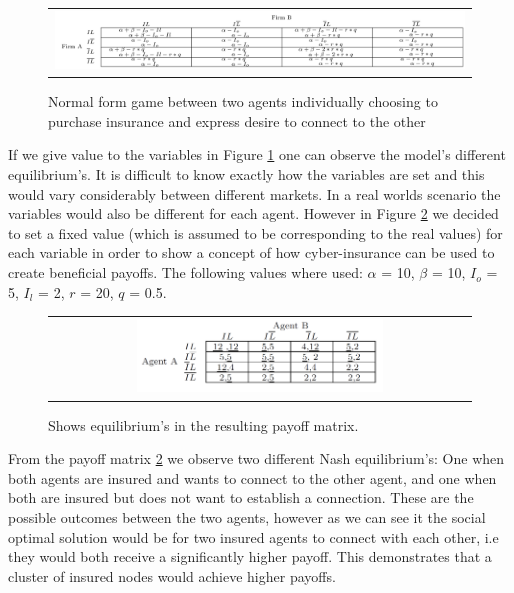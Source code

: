  
\begin{figure}[h]
\centering
\begin{tabular}{@{}c@{}}
\includegraphics[width=1.0\textwidth]{../Figures/gameTheoryModel1WithEquations.png}
\end{tabular}
\caption[Caption for LOF]{\label{fig:GTmodel1equations} Normal form game between two agents individually choosing to purchase insurance and express desire to connect to the other  \footnotemark }
\end{figure}

If we give value to the variables in Figure \ref{fig:GTmodel1equations} one can observe the model's different equilibrium's. It is difficult to know exactly how the variables are set and this would vary considerably between different markets. In a real worlds scenario the variables would also be different for each agent. However in Figure \ref{fig:GTmodel1} we decided to set a fixed value (which is assumed to be corresponding to the real values) for each variable in order to show a concept of how cyber-insurance can be used to create beneficial payoffs.
The following values where used: $\alpha$ = 10, $\beta$ = 10, $I_{o}$ = 5, $I_{l}$ = 2, $r$  = 20, $q$ = 0.5.


\begin{figure}[h]
\centering
\begin{tabular}{@{}c@{}}
\includegraphics[width=0.6\textwidth]{../Figures/gameTheoryModel1WithNumbers.png}
\end{tabular}
\caption{\label{fig:GTmodel1} Shows equilibrium's in the resulting payoff matrix.}
\end{figure}

From the payoff matrix \ref{fig:GTmodel1} we observe two different Nash equilibrium's: One when both agents are insured and wants to connect to the other agent, and one when both are insured but does not want to establish a connection. These are the possible outcomes between the two agents, however as we can see it the social optimal solution would be for two insured agents to connect with each other, i.e they would both receive a significantly higher payoff. This demonstrates that a cluster of insured nodes would achieve higher payoffs.  

